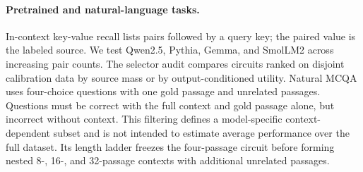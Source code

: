 \documentclass[letterpaper]{article} %
\begin{document}
\paragraph{Pretrained and natural-language tasks.}
In-context key-value recall lists pairs followed by a query key; the paired value is the labeled source.
We test Qwen2.5, Pythia, Gemma, and SmolLM2 across increasing pair counts. The selector audit compares circuits
ranked on disjoint calibration data by source mass or by output-conditioned utility. Natural MCQA uses
four-choice questions with one gold passage and unrelated passages. Questions must be correct with the full
context and gold passage alone, but incorrect without context. This filtering defines a model-specific
context-dependent subset and is not intended to estimate average performance over the full dataset. Its length
ladder freezes the four-passage circuit before forming nested 8-, 16-, and 32-passage contexts with additional
unrelated passages.
\end{document}
